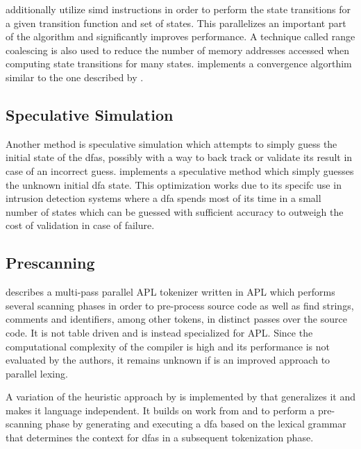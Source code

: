 \cite{mytkowicz_data-parallel_2014} additionally utilize \gls{simd} instructions
in order to perform the state transitions for a given transition function
and set of states. This parallelizes an important part of the algorithm and
significantly improves performance. A technique called range coalescing is also
used to reduce the number of memory addresses accessed when computing state
transitions for many states. \cite{zhao_--fly_2015} implements a convergence
algorthim similar to the one described by \cite{mytkowicz_data-parallel_2014}.

\subsection{Speculative Simulation} \label{speculative_simulation}

Another method is speculative simulation which attempts to simply guess the
initial state of the \gls{dfa}s, possibly with a way to back track or validate
its result in case of an incorrect guess. \cite{luchaup_multi-byte_2009,
luchaup_speculative_2011} implements a speculative method which simply guesses
the unknown initial \gls{dfa} state. This optimization works due to its specifc
use in intrusion detection systems where a \gls{dfa} spends most of its time
in a small number of states which can be guessed with sufficient accuracy to
outweigh the cost of validation in case of failure.

\subsection{Prescanning} \label{lit_prescanning}

\cite{bernecky_spmdsimd_2003} describes a multi-pass parallel APL tokenizer
written in APL which performs several scanning phases in order to pre-process
source code as well as find strings, comments and identifiers, among other
tokens, in distinct passes over the source code. It is not table driven and is
instead specialized for APL. Since the computational complexity of the compiler
is high and its performance is not evaluated by the authors, it remains unknown
if is an improved approach to parallel lexing.

A variation of the heuristic approach by \cite{barenghi_parallel_2015} is
implemented by \cite{li_plex_2021} that generalizes it and makes it language
independent. It builds on work from \cite{sinya_simultaneous_2013} and
\cite{zhao_--fly_2015} to perform a pre-scanning phase by generating and
executing a \gls{dfa} based on the lexical grammar that determines the context
for \glspl{dfa} in a subsequent tokenization phase.


